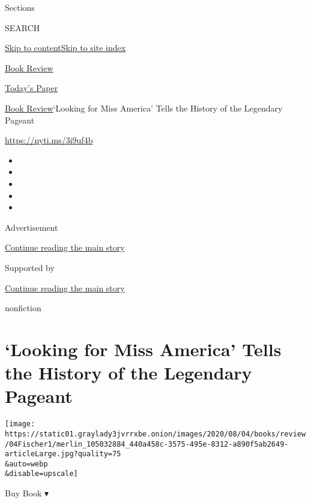 Sections

SEARCH

\protect\hyperlink{site-content}{Skip to
content}\protect\hyperlink{site-index}{Skip to site index}

\href{https://www.nytimes3xbfgragh.onion/section/books/review}{Book
Review}

\href{https://myaccount.nytimes3xbfgragh.onion/auth/login?response_type=cookie\&client_id=vi}{}

\href{https://www.nytimes3xbfgragh.onion/section/todayspaper}{Today's
Paper}

\href{/section/books/review}{Book Review}\textbar{}`Looking for Miss
America' Tells the History of the Legendary Pageant

\url{https://nyti.ms/3i9uf4b}

\begin{itemize}
\item
\item
\item
\item
\item
\end{itemize}

Advertisement

\protect\hyperlink{after-top}{Continue reading the main story}

Supported by

\protect\hyperlink{after-sponsor}{Continue reading the main story}

nonfiction

\hypertarget{looking-for-miss-america-tells-the-history-of-the-legendary-pageant}{%
\section{`Looking for Miss America' Tells the History of the Legendary
Pageant}\label{looking-for-miss-america-tells-the-history-of-the-legendary-pageant}}

\texttt{[image: https://static01.graylady3jvrrxbe.onion/images/2020/08/04/books/review/04Fischer1/merlin\_105032884\_440a458c-3575-495e-8312-a890f5ab2649-articleLarge.jpg?quality=75\\\&auto=webp\\\&disable=upscale]}

Buy Book ▾

